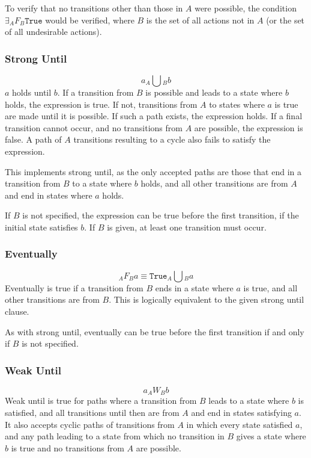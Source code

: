 \documentclass[a4paper,11pt]{article}
\begin{document}
	To verify that no transitions other than those in $A$ were possible, the condition $\exists _A F{_B}\texttt{True}$ would be verified, where $B$ is the set of all actions not in $A$ (or the set of all undesirable actions). 
	
	\subsubsection{Strong Until}
	$$a _A\bigcup{_B b} $$
	$a$ holds until $b$. If a transition from $B$ is possible and leads to a state where $b$ holds, the expression is true. If not, transitions from $A$ to states where $a$ is true are made until it is possible. If such a path exists, the expression holds. If a final transition cannot occur, and no transitions from $A$ are possible, the expression is false. A path of $A$ transitions resulting to a cycle also fails to satisfy the expression.
	
	This implements strong until, as the only accepted paths are those that end in a transition from $B$ to a state where $b$ holds, and all other transitions are from $A$ and end in states where $a$ holds.
	
	If $B$ is not specified, the expression can be true before the first transition, if the initial state satisfies $b$. If $B$ is given, at least one transition must occur.
	
	\subsubsection{Eventually}
	$$_A F{_Ba} \equiv \texttt{True} _A\bigcup{_B a} $$
	Eventually is true if a transition from $B$ ends in a state where $a$ is true, and all other transitions are from $B$. This is logically equivalent to the given strong until clause.
	
	As with strong until, eventually can be true before the first transition if and only if $B$ is not specified.
	
	\subsubsection{Weak Until}
	$$a _A W{_B b} $$
	Weak until is true for paths where a transition from $B$ leads to a state where $b$ is satisfied, and all transitions until then are from $A$ and end in states satisfying $a$. It also accepts cyclic paths of transitions from $A$ in which every state satisfied $a$, and any path leading to a state from which no transition in $B$ gives a state where $b$ is true and no transitions from $A$ are possible.
	
\end{document}
